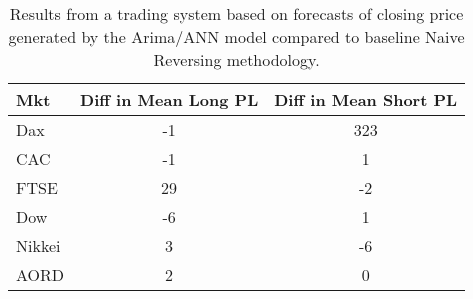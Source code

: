 \begin{table}[ht]
\centering
\caption[Arima/ANN predictions passed to System 1 compared to Naive Reversing methodology]{Results from a trading system based on forecasts of closing price generated by the Arima/ANN model compared to baseline Naive Reversing methodology.} 
\label{tab:chp_ts:arima_ann_sys1_diff}
\begin{tabular}{lcc}
  \toprule Mkt & Diff in Mean Long PL & Diff in Mean Short PL \\ 
  \midrule Dax & -1 & 323 \\ 
  CAC & -1 & 1 \\ 
  FTSE & 29 & -2 \\ 
  Dow & -6 & 1 \\ 
  Nikkei & 3 & -6 \\ 
  AORD & 2 & 0 \\ 
   \bottomrule \end{tabular}
\end{table}
